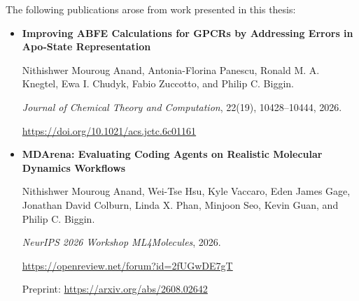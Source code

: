 The following publications arose from work presented in this thesis:

\begin{itemize}
\item \textbf{Improving ABFE Calculations for GPCRs by Addressing Errors in Apo-State Representation}

Nithishwer Mouroug Anand, Antonia-Florina Panescu, Ronald M. A. Knegtel,
Ewa I. Chudyk, Fabio Zuccotto, and Philip C. Biggin.

\textit{Journal of Chemical Theory and Computation}, 22(19), 10428--10444, 2026.

\url{https://doi.org/10.1021/acs.jctc.6c01161}

\item \textbf{MDArena: Evaluating Coding Agents on Realistic Molecular Dynamics Workflows}

Nithishwer Mouroug Anand, Wei-Tse Hsu, Kyle Vaccaro, Eden James Gage,
Jonathan David Colburn, Linda X. Phan, Minjoon Seo, Kevin Guan, and
Philip C. Biggin.

\textit{NeurIPS 2026 Workshop ML4Molecules}, 2026.

\url{https://openreview.net/forum?id=2fUGwDE7gT}

Preprint: \url{https://arxiv.org/abs/2608.02642}
\end{itemize}
